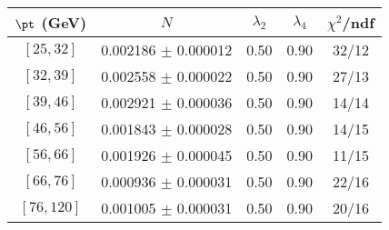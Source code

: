 \begin{tabular}{c||c|c|c|c}
$\pt$ (GeV) & $N$ & $\lambda_{2}$ & $\lambda_4$  & $\chi^2$/ndf  \\
\hline
$[25, 32]$ & 0.002186 $\pm$ 0.000012 & 0.50 & 0.90 & 32/12\\
$[32, 39]$ & 0.002558 $\pm$ 0.000022 & 0.50 & 0.90 & 27/13\\
$[39, 46]$ & 0.002921 $\pm$ 0.000036 & 0.50 & 0.90 & 14/14\\
$[46, 56]$ & 0.001843 $\pm$ 0.000028 & 0.50 & 0.90 & 14/15\\
$[56, 66]$ & 0.001926 $\pm$ 0.000045 & 0.50 & 0.90 & 11/15\\
$[66, 76]$ & 0.000936 $\pm$ 0.000031 & 0.50 & 0.90 & 22/16\\
$[76, 120]$ & 0.001005 $\pm$ 0.000031 & 0.50 & 0.90 & 20/16\\
\end{tabular}
